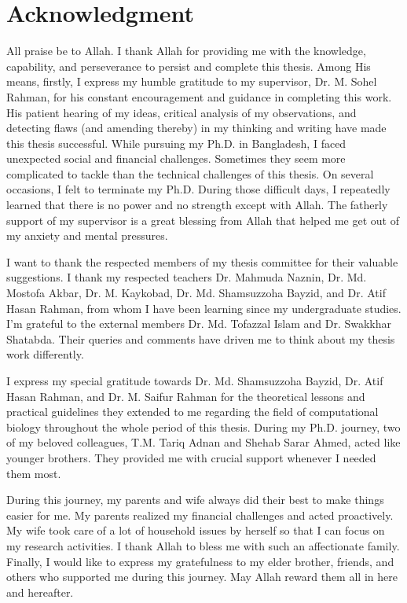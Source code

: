 \chapter*{Acknowledgment}

All praise be to Allah. I thank Allah for providing me with the knowledge, capability, and perseverance to persist and complete this thesis. Among His means, firstly, I express my humble gratitude to my supervisor, Dr. M. Sohel Rahman, for his constant encouragement and guidance in completing this work. His patient hearing of my ideas, critical analysis of my observations, and detecting flaws (and amending thereby) in my thinking and writing have made this thesis successful. While pursuing my Ph.D. in Bangladesh, I faced unexpected social and financial challenges. Sometimes they seem more complicated to tackle than the technical challenges of this thesis. On several occasions, I felt to terminate my Ph.D. During those difficult days, I repeatedly learned that there is no power and no strength except with Allah. The fatherly support of my supervisor is a great blessing from Allah that helped me get out of my anxiety and mental pressures.

I want to thank the respected members of my thesis committee for their valuable suggestions. I thank my respected teachers Dr. Mahmuda Naznin, Dr. Md. Mostofa Akbar, Dr. M. Kaykobad, Dr. Md. Shamsuzzoha Bayzid, and Dr. Atif Hasan Rahman, from whom I have been learning since my undergraduate studies. I'm grateful to the external members Dr. Md. Tofazzal Islam and Dr. Swakkhar Shatabda. Their queries and comments have driven me to think about my thesis work differently.

I express my special gratitude towards Dr. Md. Shamsuzzoha Bayzid, Dr. Atif Hasan Rahman, and Dr. M. Saifur Rahman for the theoretical lessons and practical guidelines they extended to me regarding the field of computational biology throughout the whole period of this thesis. During my Ph.D. journey, two of my beloved colleagues, T.M. Tariq Adnan and Shehab Sarar Ahmed, acted like younger brothers. They provided me with crucial support whenever I needed them most. 

During this journey, my parents and wife always did their best to make things easier for me. My parents realized my financial challenges and acted proactively. My wife took care of a lot of household issues by herself so that I can focus on my research activities. I thank Allah to bless me with such an affectionate family. 
Finally, I would like to express my gratefulness to my elder brother, friends, and others who supported me during this journey. May Allah reward them all in here and hereafter.

